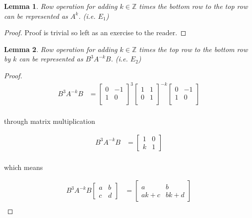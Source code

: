 \documentclass[11pt]{article}
\newcommand{\Z}{\mathbb{Z}}
\newtheorem{lemma}{Lemma}
\begin{document}
\begin{lemma}
	Row operation for adding $k \in \Z$ times the bottom row to the top row can be represented as $A^{k}$. (i.e. \(E_1\))
\end{lemma}

\begin{proof}
	Proof is trivial so left as an exercise to the reader.
\end{proof}

\begin{lemma}
	Row operation for adding $k \in \Z$ times the top row to the bottom row by $k$ can be represented as $B^{3}A^{-k}B$. (i.e. \(E_2\))
\end{lemma}

\begin{proof}
	\begin{align*}
		B^{3}A^{-k}B & = \begin{bmatrix}
			                  0 & -1 \\
			                  1 & 0  \\
		                  \end{bmatrix}^{3}  \begin{bmatrix}
			                                      1 & 1 \\
			                                      0 & 1 \\
		                                      \end{bmatrix}^{-k}\begin{bmatrix}
			                                                        0 & -1 \\
			                                                        1 & 0  \\
		                                                        \end{bmatrix} \\
	\end{align*}

	through matrix multiplication

	\begin{align*}
		B^{3}A^{-k}B & = \begin{bmatrix}
			                  1 & 0 \\
			                  k & 1
		                  \end{bmatrix} \\
	\end{align*}

	which means

	\begin{align*}
		B^{3}A^{-k}B\begin{bmatrix}
			             a & b \\
			             c & d
		             \end{bmatrix} & = \begin{bmatrix}
			                               a    & b    \\
			                               ak+c & bk+d
		                               \end{bmatrix} \\
	\end{align*}
\end{proof}
\end{document}
